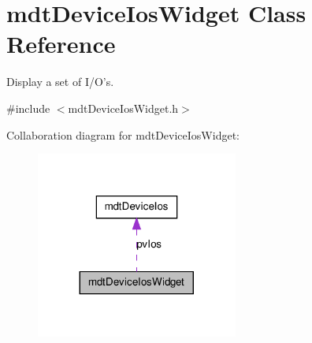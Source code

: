 \hypertarget{classmdt_device_ios_widget}{
\section{mdtDeviceIosWidget Class Reference}
\label{classmdt_device_ios_widget}
}


Display a set of I/O's.  




{\ttfamily \#include $<$mdtDeviceIosWidget.h$>$}



Collaboration diagram for mdtDeviceIosWidget:\nopagebreak
\begin{figure}[H]
\begin{center}
\leavevmode
\includegraphics[width=188pt]{classmdt_device_ios_widget__coll__graph}
\end{center}
\end{figure}
